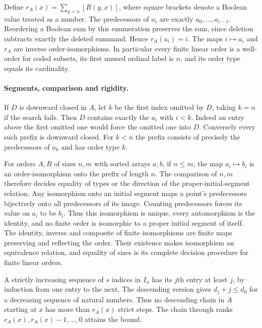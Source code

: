 Define $r_A(x)=\sum_{y<n}[R(y,x)]$, where square brackets denote a
Boolean value treated as a number. The predecessors of $a_i$ are exactly
$a_0,\ldots,a_{i-1}$. Reordering a Boolean sum by this enumeration
preserves the sum, since deletion subtracts exactly the deleted summand.
Hence $r_A(a_i)=i$. The maps $i\mapsto a_i$ and $r_A$ are inverse
order-isomorphisms. In particular every finite linear order is a
well-order for coded subsets, its first unused ordinal label is $n$, and
its order type equals its cardinality.

\paragraph{Segments, comparison and rigidity.}
If $D$ is downward closed in $A$, let $k$ be the first index omitted by
$D$, taking $k=n$ if the search fails. Then $D$ contains exactly the
$a_i$ with $i<k$. Indeed an entry above the first omitted one would force
the omitted one into $D$. Conversely every such prefix is downward
closed. For $k<n$ the prefix consists of precisely the predecessors of
$a_k$ and has order type $k$.

For orders $A,B$ of sizes $n,m$ with sorted arrays $a,b$, if $n\le m$,
the map $a_i\mapsto b_i$ is an order-isomorphism onto the prefix of
length $n$. The comparison of $n,m$ therefore decides equality of types
or the direction of the proper-initial-segment relation. Any isomorphism
onto an initial segment maps a point's predecessors bijectively onto all
predecessors of its image. Counting predecessors forces its value on
$a_i$ to be $b_i$. Thus this isomorphism is unique, every automorphism
is the identity, and no finite order is isomorphic to a proper initial
segment of itself. The identity, inverse and composite of finite
isomorphisms are finite maps preserving and reflecting the order. Their
existence makes isomorphism an equivalence relation, and equality of
sizes is its complete decision procedure for finite linear orders.

A strictly increasing sequence of $s$ indices in $I_n$ has its $j$th
entry at least $j$, by induction from one entry to the next. The
descending version gives $d_j+j\le d_0$ for a decreasing sequence of
natural numbers. Thus no descending chain in $A$ starting at $x$ has
more than $r_A(x)$ strict steps. The chain through ranks
$r_A(x),r_A(x)-1,\ldots,0$ attains the bound.

